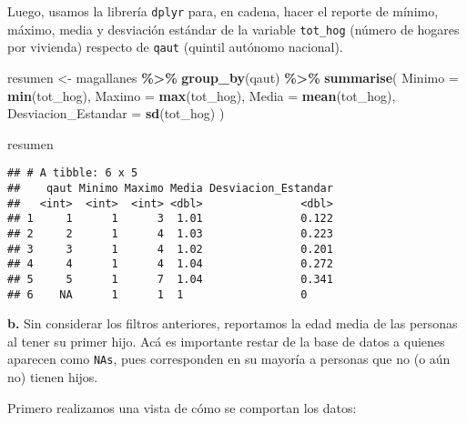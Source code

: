 \documentclass[
]{article}
\newenvironment{Shaded}{\begin{snugshade}}{\end{snugshade}}
\newcommand{\AttributeTok}[1]{\textcolor[rgb]{0.13,0.29,0.53}{#1}}
\newcommand{\FunctionTok}[1]{\textcolor[rgb]{0.13,0.29,0.53}{\textbf{#1}}}
\newcommand{\NormalTok}[1]{#1}
\newcommand{\OtherTok}[1]{\textcolor[rgb]{0.56,0.35,0.01}{#1}}
\newcommand{\SpecialCharTok}[1]{\textcolor[rgb]{0.81,0.36,0.00}{\textbf{#1}}}
\begin{document}
Luego, usamos la librería \texttt{dplyr} para, en cadena, hacer el
reporte de mínimo, máximo, media y desviación estándar de la variable
\texttt{tot\_hog} (número de hogares por vivienda) respecto de
\texttt{qaut} (quintil autónomo nacional).

\begin{Shaded}
\begin{Highlighting}[]
\NormalTok{resumen }\OtherTok{\textless{}{-}}\NormalTok{ magallanes }\SpecialCharTok{\%\textgreater{}\%}
  \FunctionTok{group\_by}\NormalTok{(qaut) }\SpecialCharTok{\%\textgreater{}\%}
  \FunctionTok{summarise}\NormalTok{(}
    \AttributeTok{Minimo =} \FunctionTok{min}\NormalTok{(tot\_hog),}
    \AttributeTok{Maximo =} \FunctionTok{max}\NormalTok{(tot\_hog),}
    \AttributeTok{Media =} \FunctionTok{mean}\NormalTok{(tot\_hog),}
    \AttributeTok{Desviacion\_Estandar =} \FunctionTok{sd}\NormalTok{(tot\_hog)}
\NormalTok{  )}

\NormalTok{resumen}
\end{Highlighting}
\end{Shaded}

\begin{verbatim}
## # A tibble: 6 x 5
##    qaut Minimo Maximo Media Desviacion_Estandar
##   <int>  <int>  <int> <dbl>               <dbl>
## 1     1      1      3  1.01               0.122
## 2     2      1      4  1.03               0.223
## 3     3      1      4  1.02               0.201
## 4     4      1      4  1.04               0.272
## 5     5      1      7  1.04               0.341
## 6    NA      1      1  1                  0
\end{verbatim}

\textbf{b.} Sin considerar los filtros anteriores, reportamos la edad
media de las personas al tener su primer hijo. Acá es importante restar
de la base de datos a quienes aparecen como
\texttt{NA\textquotesingle{}s}, pues corresponden en su mayoría a
personas que no (o aún no) tienen hijos.

Primero realizamos una vista de cómo se comportan los datos:

\begin{Shaded}
\end{Shaded}
\end{document}
